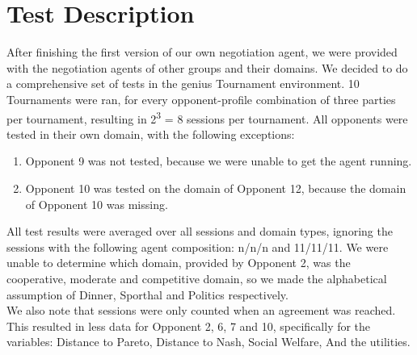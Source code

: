 \section{Test Description}

After finishing the first version of our own negotiation agent, we were provided with the negotiation agents of other groups and their domains. We decided to do a comprehensive set of tests in the genius Tournament environment. 10 Tournaments were ran, for every opponent-profile combination of three parties per tournament, resulting in 2\textsuperscript{3} = 8 sessions per tournament. All opponents were tested in their own domain, with the following exceptions:

\begin{enumerate}
	\item Opponent 9 was not tested, because we were unable to get the agent running. 
	\item Opponent 10 was tested on the domain of Opponent 12, because the domain of Opponent 10 was missing.
\end{enumerate}

All test results were averaged over all sessions and domain types, ignoring the sessions with the following agent composition: n/n/n and 11/11/11.
We were unable to determine which domain, provided by Opponent 2, was the cooperative, moderate and competitive domain, so we made the alphabetical assumption of Dinner, Sporthal and Politics respectively.\\

We also note that sessions were only counted when an agreement was reached. This resulted in less data for Opponent 2, 6, 7 and 10, specifically for the variables: Distance to Pareto, Distance to Nash, Social Welfare, And the utilities.